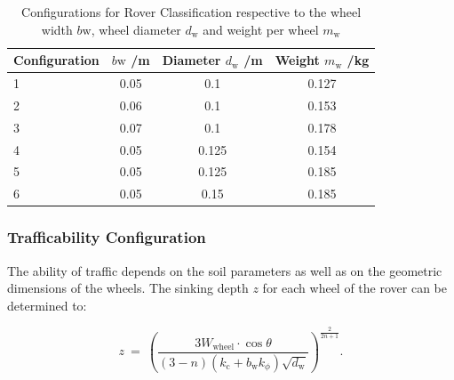 \begin{table}[htb]
\centering
\caption{Configurations for Rover Classification respective to the wheel width \(b\text{w}\), wheel diameter \(d_\text{w}\) and weight per wheel \(m_\text{w}\)}
\begin{adjustbox}{max width=\textwidth}
\begin{tabular}[l]{lccc}

	\toprule
		\multicolumn{1}{l}{Configuration} & \multicolumn{1}{c}{\(b\text{w}\) /m} & \multicolumn{1}{c}{Diameter \(d_\text{w}\) /m} & \multicolumn{1}{c}{Weight \(m_\text{w}\) /kg}   \\

	\midrule
		
		1	&	0.05	&	0.1		&	0.127		\\	
		2	&	0.06	&	0.1		&	0.153		\\
		3	&	0.07	&	0.1		&	0.178		\\
		4	&	0.05	&	0.125	&	0.154		\\
		5	&	0.05	&	0.125	&	0.185		\\
		6	&	0.05	&	0.15	&	0.185		\\

	\bottomrule

\end{tabular}
\end{adjustbox}
\label{tab:Configurations}
\end{table}



\subsubsection*{Trafficability Configuration}
\label{sec:DP}

The ability of traffic depends on the soil parameters as well as on the geometric dimensions of the wheels. The sinking depth \(z\) for each wheel of the rover can be determined to:

\begin{equation}
	z \:  = \:	\left( \frac{3 W_\text{wheel} \cdot \cos \theta}{(3-n)(k_\text{c} + b_\text{w}k_\phi) \sqrt{d_\text{w}}} \right) ^{\frac{2}{2n+1}}	.
	\label{eq:Sinkage}
\end{equation}





